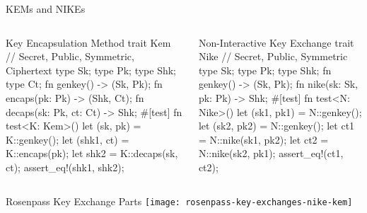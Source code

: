\begin{frame}[fragile,T]{KEMs and NIKEs}
  \begin{columns}[t,fullwidth]
      \hfill
    \begin{column}{.47\linewidth}
\begin{rustblock}{Key Encapsulation Method}
trait Kem {
  // Secret, Public, Symmetric, Ciphertext
  type Sk; type Pk; type Shk; type Ct;
  fn genkey() -> (Sk, Pk);
  fn encaps(pk: Pk) -> (Shk, Ct);
  fn decaps(sk: Pk, ct: Ct) -> Shk;
}
#[test]
fn test<K: Kem>() {
  let (sk, pk) = K::genkey();
  let (shk1, ct) = K::encaps(pk);
  let shk2 = K::decaps(sk, ct);
  assert_eq!(shk1, shk2);
}
\end{rustblock}
    \end{column}
    \hfill
    \begin{column}{.47\linewidth}
\begin{rustblock}{Non-Interactive Key Exchange}
trait Nike {
  // Secret, Public, Symmetric
  type Sk; type Pk; type Shk;
  fn genkey() -> (Sk, Pk);
  fn nike(sk: Sk, pk: Pk) -> Shk;
}
#[test]
fn test<N: Nike>() {
  let (sk1, pk1) = N::genkey();
  let (sk2, pk2) = N::genkey();
  let ct1 = N::nike(sk1, pk2);
  let ct2 = N::nike(sk2, pk1);
  assert_eq!(ct1, ct2);
}
\end{rustblock}
    \end{column}
	\hfill
  \end{columns}
\end{frame}

\begin{frame}{Rosenpass Key Exchange Parts}
  \centering
  \texttt{[image: rosenpass-key-exchanges-nike-kem]}
\end{frame}








